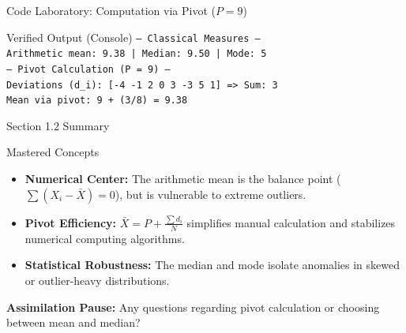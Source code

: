 \documentclass[aspectratio=169,xcolor={dvipsnames,table}]{beamer}
\begin{document}
\begin{frame}[fragile]{Code Laboratory: Computation via Pivot ($P = 9$)}
  \vspace{0.2em}
  {\lstset{basicstyle=\ttfamily\tiny, aboveskip=0.2em, belowskip=0.2em}
  
  }

  \vspace{0.2em}
  \begin{block}{\footnotesize Verified Output (Console)}
    {\fontsize{6.5pt}{7.5pt}\selectfont
    \texttt{--- Classical Measures ---} \\
    \texttt{Arithmetic mean: 9.38 | Median: 9.50 | Mode: 5} \\
    \texttt{--- Pivot Calculation (P = 9) ---} \\
    \texttt{Deviations (d\_i): [-4 -1  2  0  3 -3  5  1] => Sum: 3} \\
    \texttt{Mean via pivot:   9 + (3/8) = 9.38}
    }
  \end{block}
\end{frame}





\begin{frame}{Section 1.2 Summary}
  \begin{block}{Mastered Concepts}
    \begin{itemize}
      \item \textbf{Numerical Center:} The arithmetic mean is the balance point ($\sum(X_i - \bar{X}) = 0$), but is vulnerable to extreme outliers. \pause
      \item \textbf{Pivot Efficiency:} $\bar{X} = P + \frac{\sum d_i}{N}$ simplifies manual calculation and stabilizes numerical computing algorithms. \pause
      \item \textbf{Statistical Robustness:} The median and mode isolate anomalies in skewed or outlier-heavy distributions.
    \end{itemize}
  \end{block}
  \pause
  \vspace{0.8em}
  \begin{center}
    \color{TecAzulOscuro}\textbf{Assimilation Pause:} Any questions regarding pivot calculation or choosing between mean and median?
    \color{black}
  \end{center}
\end{frame}
\end{document}
